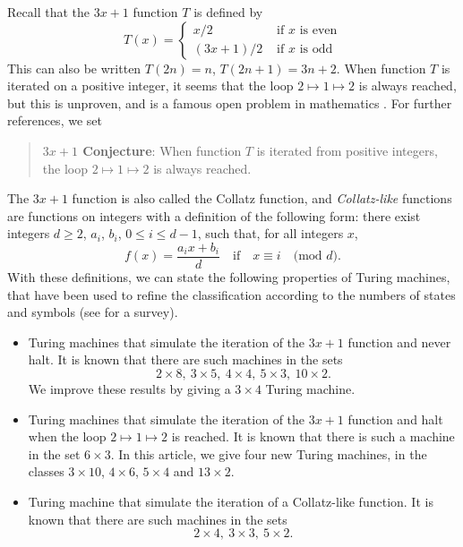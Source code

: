 \documentclass[10pt]{article}
\begin{document}
Recall that the $3x + 1$ function $T$ is defined by
$$T(x) =\left\{
\begin{array}{ll}
x/2       & \mbox{ if $x$ is even}\\
(3x +1)/2 & \mbox{ if $x$ is odd}
\end{array}\right.$$
This can also be written $T(2n) = n$, $T(2n + 1) = 3n + 2$.
When function $T$ is iterated on a positive integer, it seems that the loop
$2 \mapsto 1 \mapsto 2$ is always reached, but this is unproven, and is a famous open problem
in mathematics \cite{La10}. For further references, we set
\begin{quote}
{\bf {\boldmath $3 x + 1$} Conjecture}: When function $T$ is iterated from positive integers,
the loop $2 \mapsto 1 \mapsto 2$ is always reached.
\end{quote}
The $3x + 1$ function is also called the Collatz function, and \emph{Collatz-like} functions
are functions on integers with a definition of the following form: 
there exist integers $d \ge 2$, $a_i$, $b_i$, $0 \le i \le d-1$, such that, for all integers $x$,
$$f(x) = \frac{a_ix + b_i}{d}\quad \mbox{if}\quad x \equiv i\quad \mbox{(mod $d$)}.$$
With these definitions, we can state the following properties of Turing machines,
that have been used to refine the classification according to the numbers of states and symbols
(see \cite{MM10} for a survey).
\begin{itemize}
\item Turing machines that simulate the iteration of the $3x + 1$ function
and never halt. It is known that there are such machines in the sets
$$2 \times 8,\ 3 \times 5,\ 4 \times 4,\ 5 \times 3,\ 10 \times 2.$$
We improve these results by giving a $3 \times 4$ Turing machine.
\item Turing machines that simulate the iteration of the $3x +1$ function
and halt when the loop $2 \mapsto 1 \mapsto 2$ is reached.
It is known that there is such a machine in the set $6 \times 3$.
In this article, we give four new Turing machines, in the classes
$3 \times 10$, $4 \times 6$, $5 \times 4$ and $13 \times 2$.
\item Turing machine that simulate the iteration of a Collatz-like function.
It is known that there are such machines in the sets
$$2 \times 4,\ 3 \times 3,\ 5 \times 2.$$
\end{itemize}
\end{document}
